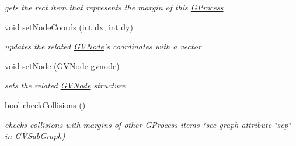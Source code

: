 \begin{DoxyCompactItemize}
\begin{DoxyCompactList}\small\item\em gets the rect item that represents the margin of this \hyperlink{class_g_process}{\-G\-Process} \end{DoxyCompactList}\item 
void \hyperlink{class_g_process_a617697e8c6615615c988dd5b24a3679d}{set\-Node\-Coords} (int dx, int dy)
\begin{DoxyCompactList}\small\item\em updates the related \hyperlink{struct_g_v_node}{\-G\-V\-Node}'s coordinates with a vector \end{DoxyCompactList}\item 
void \hyperlink{class_g_process_a7cea82b28af35301adb9b57eabdcd655}{set\-Node} (\hyperlink{struct_g_v_node}{\-G\-V\-Node} gvnode)
\begin{DoxyCompactList}\small\item\em sets the related \hyperlink{struct_g_v_node}{\-G\-V\-Node} structure \end{DoxyCompactList}\item 
bool \hyperlink{class_g_process_a5d4e69825de4164b800ff832d9279715}{check\-Collisions} ()
\begin{DoxyCompactList}\small\item\em checks collisions with margins of other \hyperlink{class_g_process}{\-G\-Process} items (see graph attribute \char`\"{}sep\char`\"{} in \hyperlink{class_g_v_sub_graph}{\-G\-V\-Sub\-Graph}) \end{DoxyCompactList}\end{DoxyCompactItemize}
